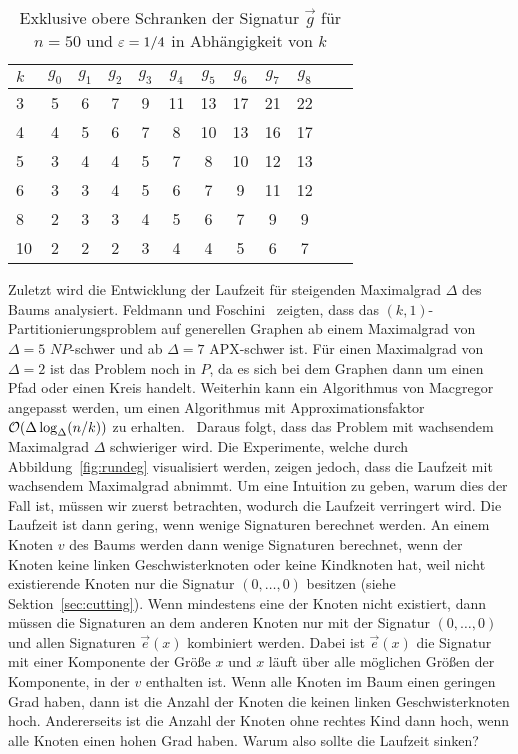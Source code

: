 \begin{table}
    \centering
    \begin{tabular}{l*{11}{c}}
        \toprule
        $k$ & $g_0$ & $g_1$ & $g_2$ & $g_3$ & $g_4$ & $g_5$ & $g_6$ & $g_7$ & $g_8$ \\
        \midrule
        3 & 5 & 6 & 7 & 9 & 11 & 13 & 17 & 21 & 22 \\
        4 & 4 & 5 & 6 & 7 & 8 & 10 & 13 & 16 & 17 \\
        5 & 3 & 4 & 4 & 5 & 7 & 8 & 10 & 12 & 13 \\ 
        6 & 3 & 3 & 4 & 5 & 6 & 7 & 9 & 11 & 12 \\ 
        8 & 2 & 3 & 3 & 4 & 5 & 6 & 7 & 9 & 9 \\ 
        10 & 2 & 2 & 2 & 3 & 4 & 4 & 5 & 6 & 7 \\ 
        \bottomrule
    \end{tabular}
    \caption{Exklusive obere Schranken der Signatur $\vec{g}$ für $n=50$ und $\varepsilon=1/4$ in Abhängigkeit von $k$}\label{tab:ksig}
\end{table}

Zuletzt wird die Entwicklung der Laufzeit für steigenden Maximalgrad $\Delta$ des Baums analysiert.
Feldmann und Foschini~\cite{FF15} zeigten, dass das $(k, 1)$\hyp Partitionierungsproblem auf generellen Graphen ab einem Maximalgrad von $\Delta=5$ $NP$\hyp schwer und ab $\Delta=7$ APX-schwer ist.
Für einen Maximalgrad von $\Delta=2$ ist das Problem noch in $P$, da es sich bei dem Graphen dann um einen Pfad oder einen Kreis handelt.
Weiterhin kann ein Algorithmus von Macgregor~\cite{mcg78} angepasst werden, um einen Algorithmus mit Approximationsfaktor $\mathcal{O}(\Delta \log_\Delta(n/k))$ zu erhalten.~\cite{FF15}
Daraus folgt, dass das Problem mit wachsendem Maximalgrad $\Delta$ schwieriger wird.
Die Experimente, welche durch Abbildung~\ref{fig:rundeg} visualisiert werden, zeigen jedoch, dass die Laufzeit mit wachsendem Maximalgrad abnimmt.
Um eine Intuition zu geben, warum dies der Fall ist, müssen wir zuerst betrachten, wodurch die Laufzeit verringert wird.
Die Laufzeit ist dann gering, wenn wenige Signaturen berechnet werden.
An einem Knoten $v$ des Baums werden dann wenige Signaturen berechnet, wenn der Knoten keine linken Geschwisterknoten oder keine Kindknoten hat, weil nicht existierende Knoten nur die Signatur $(0, \ldots, 0)$ besitzen (siehe Sektion~\ref{sec:cutting}).
Wenn mindestens eine der Knoten nicht existiert, dann müssen die Signaturen an dem anderen Knoten nur mit der Signatur $(0, \ldots, 0)$ und allen Signaturen $\vec{e}(x)$ kombiniert werden.
Dabei ist $\vec{e}(x)$ die Signatur mit einer Komponente der Größe $x$ und $x$ läuft über alle möglichen Größen der Komponente, in der $v$ enthalten ist.
Wenn alle Knoten im Baum einen geringen Grad haben, dann ist die Anzahl der Knoten die keinen linken Geschwisterknoten hoch. 
Andererseits ist die Anzahl der Knoten ohne rechtes Kind dann hoch, wenn alle Knoten einen hohen Grad haben.
Warum also sollte die Laufzeit sinken?

